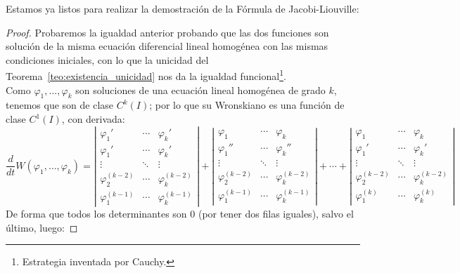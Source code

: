 \noindent
Estamos ya listos para realizar la demostración de la Fórmula de Jacobi-Liouville:
\begin{proof}
    Probaremos la igualdad anterior probando que las dos funciones son solución de la misma ecuación diferencial lineal homogénea con las mismas condiciones iniciales, con lo que la unicidad del Teorema~\ref{teo:existencia_unicidad} nos da la igualdad funcional\footnote{Estrategia inventada por Cauchy.}.\\

    Como $\varphi_1,\ldots,\varphi_k$ son soluciones de una ecuación lineal homogénea de grado $k$, tenemos que son de clase $C^k(I)$; por lo que su Wronskiano es una función de clase $C^1(I)$, con derivada:
    \begin{equation*}
        \dfrac{d}{dt} W(\varphi_1,\ldots,\varphi_k) = \left|\begin{array}{ccc}
            \varphi_1' & \cdots & \varphi_k' \\
            \varphi_1' & \cdots & \varphi_k' \\
            \vdots & \ddots & \vdots \\
            \varphi_2^{(k-2)} & \cdots & \varphi_k^{(k-2)} \\
            \varphi_1^{(k-1)} & \cdots & \varphi_k^{(k-1)} 
        \end{array}\right| + 
        \left|\begin{array}{ccc}
            \varphi_1 & \cdots & \varphi_k \\
            \varphi_1'' & \cdots & \varphi_k'' \\
            \vdots & \ddots & \vdots \\
            \varphi_2^{(k-2)} & \cdots & \varphi_k^{(k-2)} \\
            \varphi_1^{(k-1)} & \cdots & \varphi_k^{(k-1)} 
        \end{array}\right| + \cdots + 
        \left|\begin{array}{ccc}
            \varphi_1 & \cdots & \varphi_k \\
            \varphi_1' & \cdots & \varphi_k' \\
            \vdots & \ddots & \vdots \\
            \varphi_2^{(k-2)} & \cdots & \varphi_k^{(k-2)} \\
            \varphi_1^{(k)} & \cdots & \varphi_k^{(k)} 
        \end{array}\right| 
    \end{equation*}
    De forma que todos los determinantes son 0 (por tener dos filas iguales), salvo el último, luego:

\end{proof}
